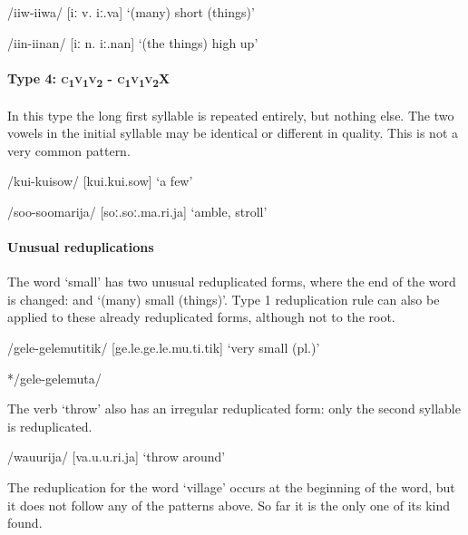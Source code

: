 /iiw-iiwa/  [{{\textprimstress}}iː v.{{\textprimstress}}{{\textprimstress}} iː.va]  `(many) short (things)'

/iin-iinan/  [{{\textprimstress}}iː n.{{\textprimstress}{{\textprimstress}} iː.nan}]  `(the things) high up'

\paragraph[Type 4:  \textsc{c1v1v2} - \textsc{c1v1v2X}]{Type 4:  \textsc{c}\textsubscript{1}\textsc{v}\textsubscript{1}\textsc{v}\textsubscript{2} - \textsc{c}\textsubscript{1}\textsc{v}\textsubscript{1}\textsc{v}\textsubscript{2}X}

In this type the long first syllable is repeated entirely, but nothing else.  The two vowels in the initial syllable may be identical or different in quality. This is not a very common pattern.

/kui-kuisow/  [{{\textprimstress}}kui.{{\textprimstress}}{{\textprimstress}}kui.sow]  `a few'

/soo-soomarija/  [{{\textprimstress}}soː.{{\textprimstress}}{{\textprimstress}}soː.ma.ri.ja]  `amble, stroll'

\paragraph[Unusual reduplications]{Unusual reduplications}

The word  `small' has two unusual reduplicated forms, where the end of the word is changed:  and  `(many) small (things)'.  Type 1 reduplication rule can also be applied to these already reduplicated forms, although not to the root.

/gele-gelemutitik/  [ge.{{\textprimstress}}le.ge.{{\textprimstress}}{{\textprimstress}}le.mu.ti.tik]  `very small (pl.)'

*/gele-gelemuta/

The verb  `throw' also has an irregular reduplicated form: only the second syllable is reduplicated.

/wa{\textphi}u{\textphi}urija/  [va.{{\textprimstress}}{\textphi}u.{\textphi}u.ri.ja]  `throw around'

The reduplication for the word  `village' occurs at the beginning of the word, but it does not follow any of the patterns above. So far it is the only one of its kind found.

